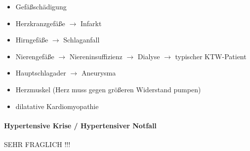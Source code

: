 \documentclass{article}
\begin{document}
\begin{itemize}
\item Gef\"a{\ss}sch\"adigung

\end{itemize}
\begin{itemize}
\item Herzkranzgef\"a{\ss}e ${\rightarrow}$ Infarkt

\item Hirngef\"a{\ss}e ${\rightarrow}$ Schlaganfall

\item Nierengef\"a{\ss}e ${\rightarrow}$ Niereninsuffizienz
${\rightarrow}$ Dialyse ${\rightarrow}$ typischer KTW-Patient

\item Hauptschlagader ${\rightarrow}$ Aneurysma%
%


\end{itemize}
\begin{itemize}
\item Herzmuskel (Herz muss gegen gr\"o{\ss}eren Widerstand pumpen) 

\end{itemize}
\begin{itemize}
\item dilatative Kardiomyopathie

\end{itemize}
\paragraph[Hypertensive Krise / Hypertensiver \ Notfall]{Hypertensive
Krise / Hypertensiver  Notfall}
SEHR FRAGLICH !!!
\end{document}

